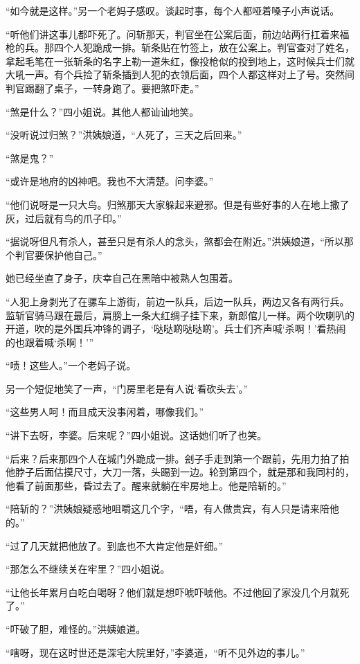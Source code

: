 \par “如今就是这样。”另一个老妈子感叹。谈起时事，每个人都哑着嗓子小声说话。
\par “听他们讲这事儿都吓死了。问斩那天，判官坐在公案后面，前边站两行扛着来福枪的兵。那四个人犯跪成一排。斩条贴在竹签上，放在公案上。判官查对了姓名，拿起毛笔在一张斩条的名字上勒一道朱红，像投枪似的投到地上，这时候兵士们就大吼一声。有个兵捡了斩条插到人犯的衣领后面，四个人都这样对上了号。突然间判官踢翻了桌子，一转身跑了。要把煞吓走。”
\par “煞是什么？”四小姐说。其他人都讪讪地笑。
\par “没听说过归煞？”洪姨娘道，“人死了，三天之后回来。”
\par “煞是鬼？”
\par “或许是地府的凶神吧。我也不大清楚。问李婆。”
\par “他们说呀是一只大鸟。归煞那天大家躲起来避邪。但是有些好事的人在地上撒了灰，过后就有鸟的爪子印。”
\par “据说呀但凡有杀人，甚至只是有杀人的念头，煞都会在附近。”洪姨娘道，“所以那个判官要保护他自己。”
\par 她已经坐直了身子，庆幸自己在黑暗中被熟人包围着。
\par “人犯上身剥光了在骡车上游街，前边一队兵，后边一队兵，两边又各有两行兵。监斩官骑马跟在最后，肩膀上一条大红绸子挂下来，新郎倌儿一样。两个吹喇叭的开道，吹的是外国兵冲锋的调子，‘哒哒啲哒哒啲’。兵士们齐声喊‘杀啊！’看热闹的也跟着喊‘杀啊！’”
\par “啧！这些人。”一个老妈子说。
\par 另一个短促地笑了一声，“门房里老是有人说‘看砍头去’。”
\par “这些男人呵！而且成天没事闲着，哪像我们。”
\par “讲下去呀，李婆。后来呢？”四小姐说。这话她们听了也笑。
\par “后来？后来那四个人在城门外跪成一排。刽子手走到第一个跟前，先用力拍了拍他脖子后面估摸尺寸，大刀一落，头踢到一边。轮到第四个，就是那和我同村的，他看了前面那些，昏过去了。醒来就躺在牢房地上。他是陪斩的。”
\par “陪斩的？”洪姨娘疑惑地咀嚼这几个字，“唔，有人做贵宾，有人只是请来陪他的。”
\par “过了几天就把他放了。到底也不大肯定他是奸细。”
\par “那怎么不继续关在牢里？”四小姐说。
\par “让他长年累月白吃白喝呀？他们就是想吓唬吓唬他。不过他回了家没几个月就死了。”
\par “吓破了胆，难怪的。”洪姨娘道。
\par “嗐呀，现在这时世还是深宅大院里好，”李婆道，“听不见外边的事儿。”
